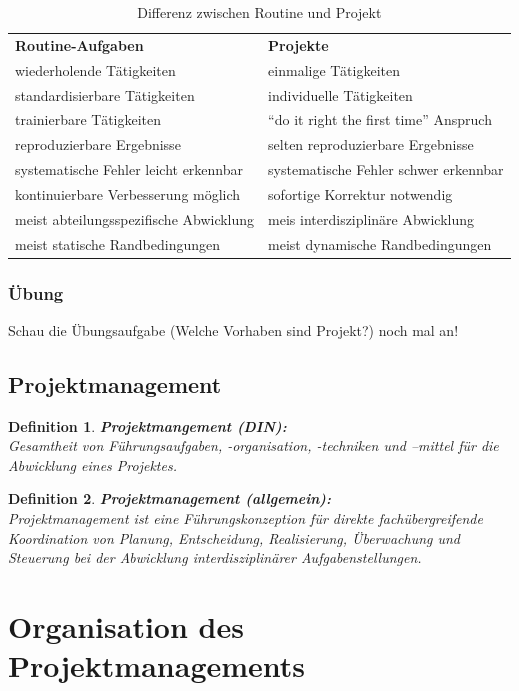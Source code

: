 \documentclass[11pt,a4paper]{article}
\newenvironment{de}[1]
{\begin{mdframed}[style=de]\begin{mydef}{\textbf{#1:}}\\} 
{\end{mydef}\end{mdframed}}
\newtheorem{mydef}{Definition}
\begin{document}
\begin{table}[H]
\centering
\def\arraystretch{1.4}
\begin{tabular}{|P{0.4\textwidth}|P{0.4\textwidth}|}
\hline
\textbf{Routine-Aufgaben} & \textbf{Projekte}\\
wiederholende Tätigkeiten & einmalige Tätigkeiten\\
standardisierbare Tätigkeiten & individuelle Tätigkeiten\\
trainierbare Tätigkeiten & ``do it right the first time'' Anspruch\\
reproduzierbare Ergebnisse & selten reproduzierbare Ergebnisse\\
systematische Fehler leicht erkennbar  & systematische Fehler schwer erkennbar\\
kontinuierbare Verbesserung möglich & sofortige Korrektur notwendig\\
meist abteilungsspezifische Abwicklung & meis interdisziplinäre Abwicklung\\
meist statische Randbedingungen & meist dynamische Randbedingungen\\
\hline
\end{tabular}
\caption{Differenz zwischen Routine und Projekt}
\end{table}

\subsubsection*{Übung}
Schau die Übungsaufgabe (Welche Vorhaben sind Projekt?) noch mal an!
\subsection{Projektmanagement}

\begin{de}{Projektmangement (DIN)}
Gesamtheit von Führungsaufgaben, -organisation, -techniken und
–mittel für die Abwicklung eines Projektes.
\end{de}

\begin{de}{Projektmanagement (allgemein)}
Projektmanagement ist eine Führungskonzeption für direkte
fachübergreifende Koordination von Planung, Entscheidung,
Realisierung, Überwachung und Steuerung bei der Abwicklung
interdisziplinärer Aufgabenstellungen.
\end{de}

\section{Organisation des Projektmanagements}
\end{document}
